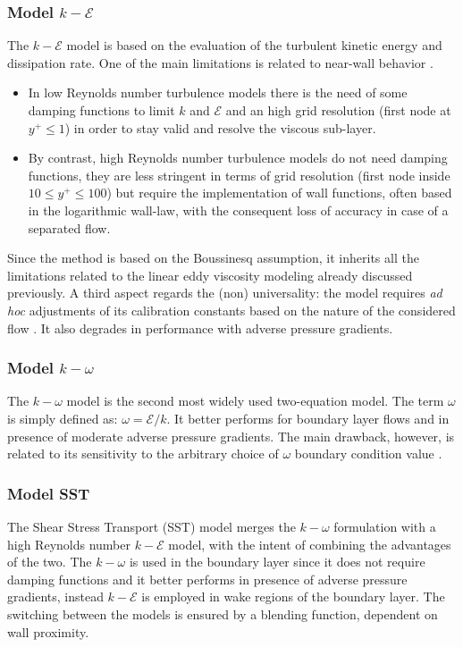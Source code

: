 \documentclass[12pt, a4paper, twoside, openright]{book}
\begin{document}
\subsubsection{Model \boldmath$k - \mathcal{E}$} The $k - \mathcal{E}$ model is based on the evaluation of the turbulent kinetic energy and dissipation rate. One of the main limitations is related to near-wall behavior \cite{cfd-blazek}.
\begin{itemize}
	\item In low Reynolds number turbulence models there is the need of some damping functions to limit $k$ and $\mathcal{E}$ and an high grid resolution (first node at $y^+ \leq 1$) in order to stay valid and resolve the viscous sub-layer.
	\item By contrast, high Reynolds number turbulence models do not need damping functions, they are less stringent in terms of grid resolution (first node inside $10 \leq y^+ \leq 100$) but require the implementation of wall functions, often based in the logarithmic wall-law, with the consequent loss of accuracy in case of a separated flow.
\end{itemize}
Since the method is based on the Boussinesq assumption, it inherits all the limitations related to the linear eddy viscosity modeling already discussed previously.
A third aspect regards the (non) universality: the model requires \textit{ad hoc} adjustments of its calibration constants based on the nature of the considered flow \cite{turbulent-flows}. It also degrades in performance with adverse pressure gradients.

\subsubsection{Model \boldmath$k - \omega$} The $k - \omega$ model is the second most widely used two-equation model. The term $\omega$ is simply defined as: $\omega = \mathcal{E}/k$. It better performs for boundary layer flows and in presence of moderate adverse pressure gradients. The main drawback, however, is related to its sensitivity to the arbitrary choice of $\omega$ boundary condition value \cite{turbulent-flows} \cite{tubulence-wilcox}.

\subsubsection{Model SST} The Shear Stress Transport (SST) model merges the $k-\omega$ formulation with a high Reynolds number $k-\mathcal{E}$ model, with the intent of combining the advantages of the two. The $k-\omega$ is used in the boundary layer since it does not require damping functions and it better performs in presence of adverse pressure gradients, instead $k-\mathcal{E}$ is employed in wake regions of the boundary layer. The switching between the models is ensured by a blending function, dependent on wall proximity.
\end{document}
